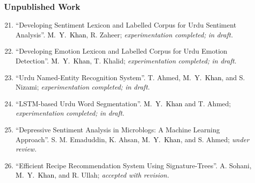 \documentclass[a4paper, 10pt]{article}
\begin{document}
\subsubsection*{{ Unpublished Work}}
\begin{enumerate}
\setcounter{enumi}{20}
\itemsep-4pt

\item ``Developing Sentiment Lexicon and Labelled Corpus for Urdu Sentiment Analysis''. \textcolor{Black}{M.~Y.~Khan}, R. Zaheer; \emph{\small experimentation completed; in draft.}

\item ``Developing Emotion Lexicon and Labelled Corpus for Urdu Emotion Detection''. \textcolor{Black}{M.~Y.~Khan}, T. Khalid; \emph{\small experimentation completed; in draft.}

\item ``Urdu Named-Entity Recognition System''. T. Ahmed, \textcolor{Black}{M.~Y.~Khan}, and S. Nizami; \emph{\small experimentation completed; in draft.}

\item ``LSTM-based Urdu Word Segmentation''. \textcolor{Black}{M.~Y.~Khan} and T. Ahmed; \emph{\small experimentation completed; in draft.}

\item ``Depressive Sentiment Analysis in Microblogs: A Machine Learning Approach''. S. M. Emaduddin, K. Ahsan, \textcolor{Black}{M.~Y.~Khan}, and S. Ahmed; \emph{\small under review.}

\item ``Efficient Recipe Recommendation System Using Signature-Trees''. A. Sohani, \textcolor{Black}{M.~Y.~Khan}, and R. Ullah;
\emph{\small accepted with revision.}




\end{enumerate}
\end{document}
